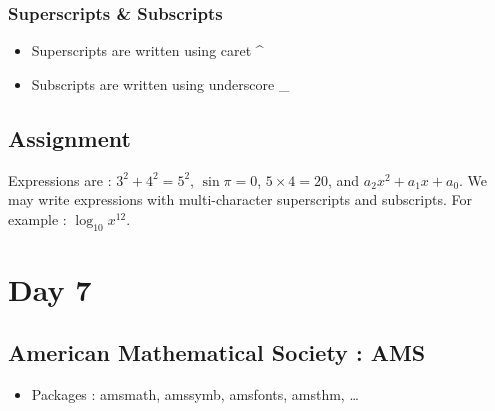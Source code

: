 \documentclass[a4paper,12pt]{article}
\begin{document}
\subsubsection*{Superscripts \& Subscripts}
\begin{itemize}
	\item Superscripts are written using caret \^{}
	\item Subscripts are written using underscore \_{}
\end{itemize}

\subsection*{Assignment}
	Expressions are : $3^2+4^2=5^2$, $\sin \pi = 0$, $5 \times 4 = 20$, and $a_2x^2 + a_1x+a_0$. We may write expressions with multi-character superscripts and subscripts. For example : $\log_{10} x^{12}$.

\section{Day 7}

\subsection{American Mathematical Society : AMS}
\begin{itemize}
	\item Packages : amsmath, amssymb, amsfonts, amsthm, \dots
\end{itemize}

%
%
\end{document}
